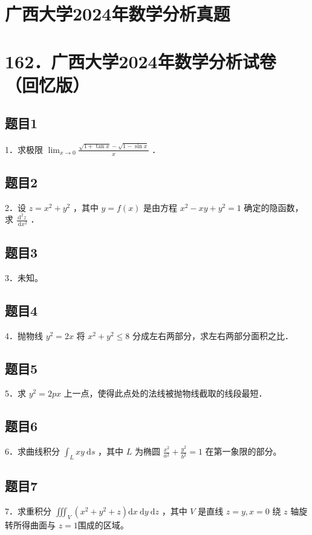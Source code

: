 \documentclass{article}
\begin{document}
\section*{广西大学2024年数学分析真题}
\section*{162．广西大学2024年数学分析试卷（回忆版）}

\subsection{题目1}
1．求极限 \(\lim _{x \rightarrow 0} \frac{\sqrt{1+\tan x}-\sqrt{1-\sin x}}{x}\) ．

\subsection{题目2}
2．设 \(z=x^{2}+y^{2}\) ，其中 \(y=f(x)\) 是由方程 \(x^{2}-x y+y^{2}=1\) 确定的隐函数，求 \(\frac{\mathrm{d}^{2} z}{\mathrm{~d} x^{2}}\) ．

\subsection{题目3}
3．未知。

\subsection{题目4}
4．抛物线 \(y^{2}=2 x\) 将 \(x^{2}+y^{2} \leq 8\) 分成左右两部分，求左右两部分面积之比．

\subsection{题目5}
5．求 \(y^{2}=2 p x\) 上一点，使得此点处的法线被抛物线截取的线段最短．

\subsection{题目6}
6．求曲线积分 \(\int_{L} x y \mathrm{~d} s\) ，其中 \(L\) 为椭圆 \(\frac{x^{2}}{a^{2}}+\frac{y^{2}}{b^{2}}=1\) 在第一象限的部分。

\subsection{题目7}
7．求重积分 \(\iiint_{V}\left(x^{2}+y^{2}+z\right) \mathrm{d} x \mathrm{~d} y \mathrm{~d} z\) ，其中 \(V\) 是直线 \(z=y, x=0\) 绕 \(z\) 轴旋转所得曲面与 \(z=1\)围成的区域。
\end{document}
